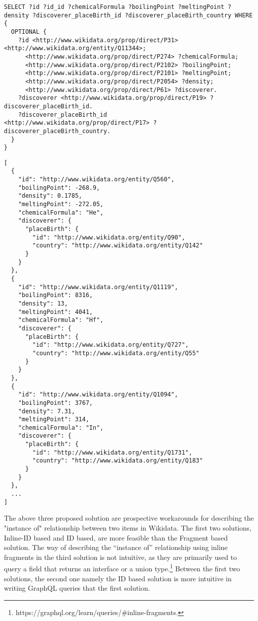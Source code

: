 \begin{minipage}{\linewidth}
\begin{lstlisting}[label=listing:listing27, caption={Generated SPARQL Query}]
SELECT ?id ?id_id ?chemicalFormula ?boilingPoint ?meltingPoint ?density ?discoverer_placeBirth_id ?discoverer_placeBirth_country WHERE {
  OPTIONAL {
    ?id <http://www.wikidata.org/prop/direct/P31> <http://www.wikidata.org/entity/Q11344>;
      <http://www.wikidata.org/prop/direct/P274> ?chemicalFormula;
      <http://www.wikidata.org/prop/direct/P2102> ?boilingPoint;
      <http://www.wikidata.org/prop/direct/P2101> ?meltingPoint;
      <http://www.wikidata.org/prop/direct/P2054> ?density;
      <http://www.wikidata.org/prop/direct/P61> ?discoverer.
    ?discoverer <http://www.wikidata.org/prop/direct/P19> ?discoverer_placeBirth_id.
    ?discoverer_placeBirth_id <http://www.wikidata.org/prop/direct/P17> ?discoverer_placeBirth_country.
  }
}
\end{lstlisting}
\end{minipage}

\begin{minipage}{\linewidth}
\begin{lstlisting}[label=listing:listing28, caption={Output}]
[
  {
    "id": "http://www.wikidata.org/entity/Q560",        
    "boilingPoint": -268.9,
    "density": 0.1785,
    "meltingPoint": -272.05,
    "chemicalFormula": "He",
    "discoverer": {
      "placeBirth": {
        "id": "http://www.wikidata.org/entity/Q90",     
        "country": "http://www.wikidata.org/entity/Q142"
      }
    }
  },
  {
    "id": "http://www.wikidata.org/entity/Q1119",       
    "boilingPoint": 8316,
    "density": 13,
    "meltingPoint": 4041,
    "chemicalFormula": "Hf",
    "discoverer": {
      "placeBirth": {
        "id": "http://www.wikidata.org/entity/Q727",
        "country": "http://www.wikidata.org/entity/Q55"
      }
    }
  },
  {
    "id": "http://www.wikidata.org/entity/Q1094",
    "boilingPoint": 3767,
    "density": 7.31,
    "meltingPoint": 314,
    "chemicalFormula": "In",
    "discoverer": {
      "placeBirth": {
        "id": "http://www.wikidata.org/entity/Q1731",
        "country": "http://www.wikidata.org/entity/Q183"
      }
    }
  },
  ...
]
\end{lstlisting}
\end{minipage}

The above three proposed solution are prospective workarounds for describing the "instance of" relationship between two items in Wikidata. The first two solutions, Inline-ID based and ID based, are more feasible than the Fragment based solution. The way of describing the “instance of” relationship using inline fragments in the third solution  is not intuitive, as they are primarily used to query a field that returns an interface or a union type.\footnote{https://graphql.org/learn/queries/\#inline-fragments.} Between the first two solutions, the second one namely the ID based solution is more intuitive in writing GraphQL queries that the first solution.

